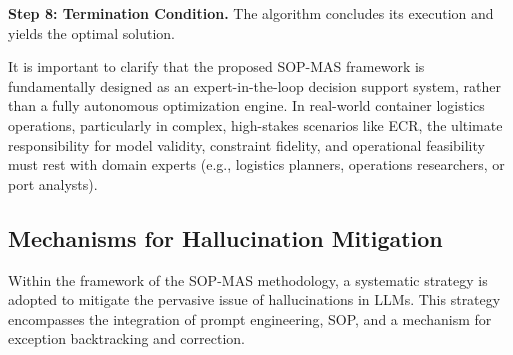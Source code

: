\documentclass[preprint,12pt]{elsarticle}
\begin{document}
\medskip
\noindent\textbf{Step 8: Termination Condition.}
The algorithm concludes its execution and yields the optimal solution.


It is important to clarify that the proposed SOP-MAS framework is fundamentally designed as an expert-in-the-loop decision support system, rather than a fully autonomous optimization engine. In real-world container logistics operations, particularly in complex, high-stakes scenarios like ECR, the ultimate responsibility for model validity, constraint fidelity, and operational feasibility must rest with domain experts (e.g., logistics planners, operations researchers, or port analysts).

\subsection{Mechanisms for Hallucination Mitigation}

Within the framework of the SOP-MAS methodology, a systematic strategy is adopted to mitigate the pervasive issue of hallucinations in LLMs. This strategy encompasses the integration of prompt engineering, SOP, and a mechanism for exception backtracking and correction.
\end{document}
